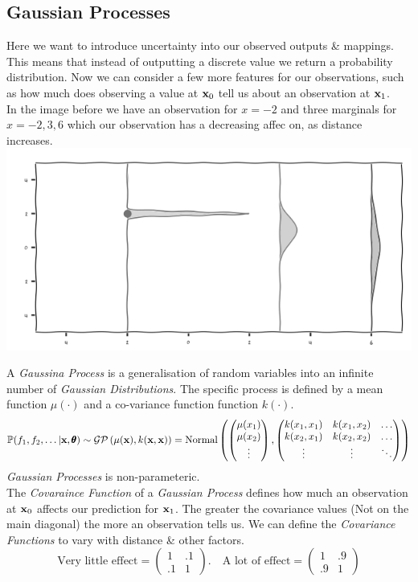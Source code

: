 \documentclass[11pt,a4paper]{article}
\begin{document}
\subsection{Gaussian Processes}

Here we want to introduce uncertainty into our observed outputs \& mappings. This means that instead of outputting a discrete value we return a probability distribution. Now we can consider a few more features for our observations, such as how much does observing a value at $\textbf{x}_0$ tell us about an observation at $\textbf{x}_1$.\\
\nb In the image before we have an observation for $x=-2$ and three marginals for $x=-2,3,6$ which our observation has a decreasing affec on, as distance increases.\\
\includegraphics[scale=1]{img/decay.png}

A \textit{Gaussina Process} is a generalisation of random variables into an infinite number of \textit{Gaussian Distributions}. The specific process is defined by a mean function $\mu(\cdot)$ and a co-variance function function $k(\cdot)$.
$$\mathbb{P}(f_1,f_2,\dots|\textbf{x},\pmb{\theta})\sim\mathcal{GP}\left(\mu(\textbf{x}),k(\textbf{x},\textbf{x})\right)=\text{Normal}\left(\begin{pmatrix}
\mu(x_1)\\\mu(x_2)\\\vdots
\end{pmatrix},\begin{pmatrix}
k(x_1,x_1)&k(x_1,x_2)&\dots\\
k(x_2,x_1)&k(x_2,x_2)&\dots\\
\vdots&\vdots&\ddots
\end{pmatrix}\right)$$
\nb \textit{Gaussian Processes} is non-parameteric.\\

The \textit{Covaraince Function} of a \textit{Gaussian Process} defines how much an observation at $\textbf{x}_0$ affects our prediction for $\textbf{x}_1$. The greater the covariance values (Not on the main diagonal) the more an observation tells us. We can define the \textit{Covariance Functions} to vary with distance \& other factors.
$$\text{Very little effect}=\begin{pmatrix}
1&.1\\
.1&1
\end{pmatrix}.\quad\text{A lot of effect}=\begin{pmatrix}
1&.9\\
.9&1
\end{pmatrix}$$
\end{document}
